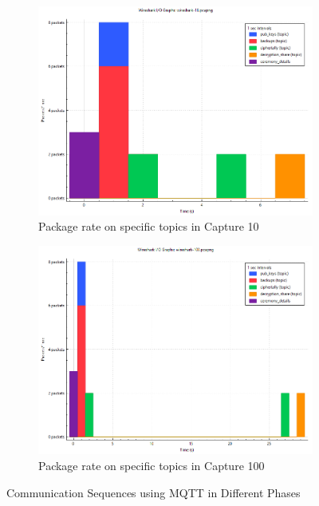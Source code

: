 \begin{figure}[ht!]
    \centering
    \begin{subfigure}[b]{\textwidth}
        \centering
        \includegraphics[width=\textwidth]{abbildungen/wireshark/wireshark-10-burst.png}
        \caption{Package rate on specific topics in Capture 10}
        \label{fig:rate-10}
    \end{subfigure}
    \hfill
    \begin{subfigure}[b]{\textwidth}
        \centering
        \includegraphics[width=\textwidth]{abbildungen/wireshark/wireshark-100-burst.png}
        \caption{Package rate on specific topics in Capture 100}
        \label{fig:rate-100}
    \end{subfigure}
    \caption{Communication Sequences using MQTT in Different Phases}
    \label{fig:rate}
\end{figure}
